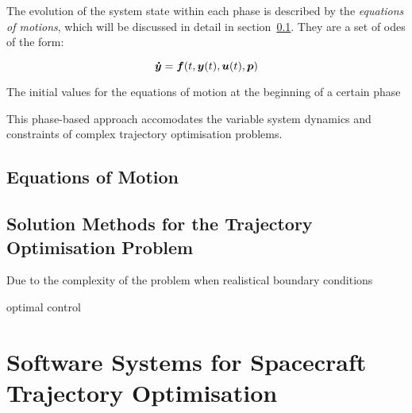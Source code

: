 The evolution of the system state within each phase is described by the \emph{equations of motions}, which will be discussed in detail in section~\ref{sec:equations-of-motion}.
They are a set of \acp{ode} of the form:

\begin{equation}
    \boldsymbol{\dot{y}} = \boldsymbol{f}(t, \boldsymbol{y}(t), \boldsymbol{u}(t), \boldsymbol{p})
    \label{eq:equations-of-motion}
\end{equation}

The initial values for the equations of motion at the beginning of a certain phase 


This phase-based approach accomodates the variable system dynamics and constraints of complex trajectory optimisation problems.

\subsection{Equations of Motion}
\label{sec:equations-of-motion}



\subsection{Solution Methods for the Trajectory Optimisation Problem}
\label{sec:solution-methods-trajectory-optimisation-problem}

Due to the complexity of the problem when realistical boundary conditions

optimal control

\section{Software Systems for Spacecraft Trajectory Optimisation}
\label{sec:software-systems-for-spacecraft-trajectory-optimisation}

\autocite{ocampo-elements-2014}

